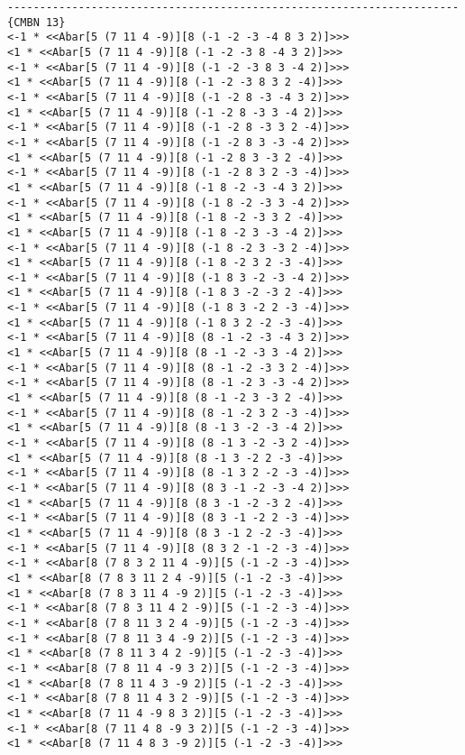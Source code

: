 {\begin{verbatim}
----------------------------------------------------------------------{CMBN 13}
<-1 * <<Abar[5 (7 11 4 -9)][8 (-1 -2 -3 -4 8 3 2)]>>>
<1 * <<Abar[5 (7 11 4 -9)][8 (-1 -2 -3 8 -4 3 2)]>>>
<-1 * <<Abar[5 (7 11 4 -9)][8 (-1 -2 -3 8 3 -4 2)]>>>
<1 * <<Abar[5 (7 11 4 -9)][8 (-1 -2 -3 8 3 2 -4)]>>>
<-1 * <<Abar[5 (7 11 4 -9)][8 (-1 -2 8 -3 -4 3 2)]>>>
<1 * <<Abar[5 (7 11 4 -9)][8 (-1 -2 8 -3 3 -4 2)]>>>
<-1 * <<Abar[5 (7 11 4 -9)][8 (-1 -2 8 -3 3 2 -4)]>>>
<-1 * <<Abar[5 (7 11 4 -9)][8 (-1 -2 8 3 -3 -4 2)]>>>
<1 * <<Abar[5 (7 11 4 -9)][8 (-1 -2 8 3 -3 2 -4)]>>>
<-1 * <<Abar[5 (7 11 4 -9)][8 (-1 -2 8 3 2 -3 -4)]>>>
<1 * <<Abar[5 (7 11 4 -9)][8 (-1 8 -2 -3 -4 3 2)]>>>
<-1 * <<Abar[5 (7 11 4 -9)][8 (-1 8 -2 -3 3 -4 2)]>>>
<1 * <<Abar[5 (7 11 4 -9)][8 (-1 8 -2 -3 3 2 -4)]>>>
<1 * <<Abar[5 (7 11 4 -9)][8 (-1 8 -2 3 -3 -4 2)]>>>
<-1 * <<Abar[5 (7 11 4 -9)][8 (-1 8 -2 3 -3 2 -4)]>>>
<1 * <<Abar[5 (7 11 4 -9)][8 (-1 8 -2 3 2 -3 -4)]>>>
<-1 * <<Abar[5 (7 11 4 -9)][8 (-1 8 3 -2 -3 -4 2)]>>>
<1 * <<Abar[5 (7 11 4 -9)][8 (-1 8 3 -2 -3 2 -4)]>>>
<-1 * <<Abar[5 (7 11 4 -9)][8 (-1 8 3 -2 2 -3 -4)]>>>
<1 * <<Abar[5 (7 11 4 -9)][8 (-1 8 3 2 -2 -3 -4)]>>>
<-1 * <<Abar[5 (7 11 4 -9)][8 (8 -1 -2 -3 -4 3 2)]>>>
<1 * <<Abar[5 (7 11 4 -9)][8 (8 -1 -2 -3 3 -4 2)]>>>
<-1 * <<Abar[5 (7 11 4 -9)][8 (8 -1 -2 -3 3 2 -4)]>>>
<-1 * <<Abar[5 (7 11 4 -9)][8 (8 -1 -2 3 -3 -4 2)]>>>
<1 * <<Abar[5 (7 11 4 -9)][8 (8 -1 -2 3 -3 2 -4)]>>>
<-1 * <<Abar[5 (7 11 4 -9)][8 (8 -1 -2 3 2 -3 -4)]>>>
<1 * <<Abar[5 (7 11 4 -9)][8 (8 -1 3 -2 -3 -4 2)]>>>
<-1 * <<Abar[5 (7 11 4 -9)][8 (8 -1 3 -2 -3 2 -4)]>>>
<1 * <<Abar[5 (7 11 4 -9)][8 (8 -1 3 -2 2 -3 -4)]>>>
<-1 * <<Abar[5 (7 11 4 -9)][8 (8 -1 3 2 -2 -3 -4)]>>>
<-1 * <<Abar[5 (7 11 4 -9)][8 (8 3 -1 -2 -3 -4 2)]>>>
<1 * <<Abar[5 (7 11 4 -9)][8 (8 3 -1 -2 -3 2 -4)]>>>
<-1 * <<Abar[5 (7 11 4 -9)][8 (8 3 -1 -2 2 -3 -4)]>>>
<1 * <<Abar[5 (7 11 4 -9)][8 (8 3 -1 2 -2 -3 -4)]>>>
<-1 * <<Abar[5 (7 11 4 -9)][8 (8 3 2 -1 -2 -3 -4)]>>>
<-1 * <<Abar[8 (7 8 3 2 11 4 -9)][5 (-1 -2 -3 -4)]>>>
<1 * <<Abar[8 (7 8 3 11 2 4 -9)][5 (-1 -2 -3 -4)]>>>
<1 * <<Abar[8 (7 8 3 11 4 -9 2)][5 (-1 -2 -3 -4)]>>>
<-1 * <<Abar[8 (7 8 3 11 4 2 -9)][5 (-1 -2 -3 -4)]>>>
<-1 * <<Abar[8 (7 8 11 3 2 4 -9)][5 (-1 -2 -3 -4)]>>>
<-1 * <<Abar[8 (7 8 11 3 4 -9 2)][5 (-1 -2 -3 -4)]>>>
<1 * <<Abar[8 (7 8 11 3 4 2 -9)][5 (-1 -2 -3 -4)]>>>
<-1 * <<Abar[8 (7 8 11 4 -9 3 2)][5 (-1 -2 -3 -4)]>>>
<1 * <<Abar[8 (7 8 11 4 3 -9 2)][5 (-1 -2 -3 -4)]>>>
<-1 * <<Abar[8 (7 8 11 4 3 2 -9)][5 (-1 -2 -3 -4)]>>>
<1 * <<Abar[8 (7 11 4 -9 8 3 2)][5 (-1 -2 -3 -4)]>>>
<-1 * <<Abar[8 (7 11 4 8 -9 3 2)][5 (-1 -2 -3 -4)]>>>
<1 * <<Abar[8 (7 11 4 8 3 -9 2)][5 (-1 -2 -3 -4)]>>>

\end{verbatim}}
